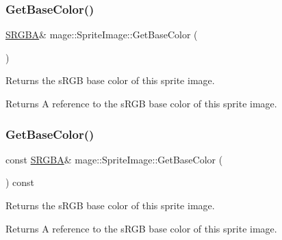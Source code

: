 \subsubsection{\texorpdfstring{Get\+Base\+Color()}{GetBaseColor()}\hspace{0.1cm}{\footnotesize\ttfamily [1/2]}}
{\footnotesize\ttfamily \hyperlink{structmage_1_1_s_r_g_b_a}{S\+R\+G\+BA}\& mage\+::\+Sprite\+Image\+::\+Get\+Base\+Color (\begin{DoxyParamCaption}{ }\end{DoxyParamCaption})\hspace{0.3cm}{\ttfamily [noexcept]}}

Returns the s\+R\+GB base color of this sprite image.

\begin{DoxyReturn}{Returns}
A reference to the s\+R\+GB base color of this sprite image. 
\end{DoxyReturn}
\hypertarget{classmage_1_1_sprite_image_a72e5087fc7f6bc1668980c5c35815906}{}\label{classmage_1_1_sprite_image_a72e5087fc7f6bc1668980c5c35815906} 
\subsubsection{\texorpdfstring{Get\+Base\+Color()}{GetBaseColor()}\hspace{0.1cm}{\footnotesize\ttfamily [2/2]}}
{\footnotesize\ttfamily const \hyperlink{structmage_1_1_s_r_g_b_a}{S\+R\+G\+BA}\& mage\+::\+Sprite\+Image\+::\+Get\+Base\+Color (\begin{DoxyParamCaption}{ }\end{DoxyParamCaption}) const\hspace{0.3cm}{\ttfamily [noexcept]}}

Returns the s\+R\+GB base color of this sprite image.

\begin{DoxyReturn}{Returns}
A reference to the s\+R\+GB base color of this sprite image. 
\end{DoxyReturn}
\hypertarget{classmage_1_1_sprite_image_a955225e8274ae5f39f6eb6f6fbb75638}{}\label{classmage_1_1_sprite_image_a955225e8274ae5f39f6eb6f6fbb75638} 
